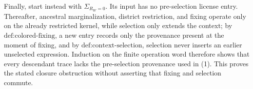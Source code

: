 Finally, start instead with \(\Sigma_{R_W=0}\).  Its input has no pre-selection license entry.  Thereafter, ancestral marginalization, district restriction, and fixing operate only on the already restricted kernel, while selection only extends the context; by \(\text{def:colored-fixing}\), a new entry records only the provenance present at the moment of fixing, and by \(\text{def:context-selection}\), selection never inserts an earlier unselected expression.  Induction on the finite operation word therefore shows that every descendant trace lacks the pre-selection provenance used in (1).  This proves the stated closure obstruction without asserting that fixing and selection commute.